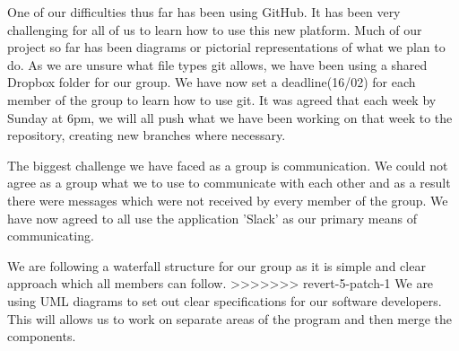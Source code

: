 \documentclass[11pt]{article}
\begin{document}
		One of our difficulties thus far has been using GitHub. 
		It has been very challenging for all of us to learn how to use this new platform. 
		Much of our project so far has been diagrams or pictorial representations of what we plan to do. 
		As we are unsure what file types git allows, we have been using a shared Dropbox folder for our group. 
		We have now set a deadline(16/02) for each member of the group to learn how to use git. 
		It was agreed that each week by Sunday at 6pm, we will all push what we have been working on that week to the repository, creating new branches where necessary. 
		
		The biggest challenge we have faced as a group is communication. 
		We could not agree as a group what we to use to communicate with each other and as a result there were messages which were not received by every member of the group. 
		We have now agreed to all use the application 'Slack' as our primary means of communicating. 
		
		We are following a waterfall structure for our group as it is simple and clear approach which all members can follow. 
>>>>>>> revert-5-patch-1
		We are using UML diagrams to set out clear specifications for our software developers. 
		This will allows us to work on separate areas of the program and then merge the components.  
	
%	
		



	
\end{document}
